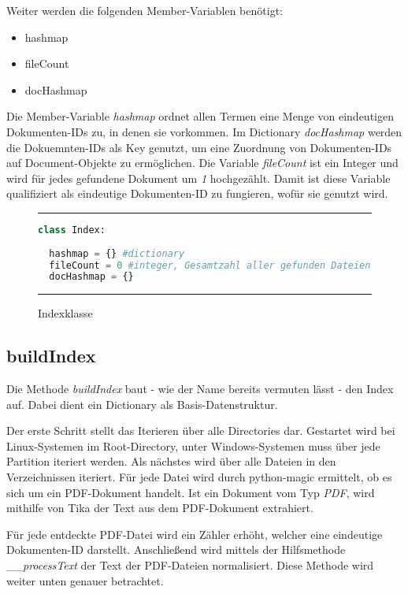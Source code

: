 Weiter werden die folgenden Member-Variablen benötigt:

\begin{itemize}
	\item hashmap
	\item fileCount
	\item docHashmap
\end{itemize}

Die Member-Variable \emph{hashmap} ordnet allen Termen eine Menge von eindeutigen Dokumenten-IDs zu, in denen sie vorkommen. Im Dictionary \emph{docHashmap} werden die Dokuemnten-IDs als Key genutzt, um eine Zuordnung von Dokumenten-IDs auf Document-Objekte zu ermöglichen. Die Variable \emph{fileCount} ist ein Integer und wird für jedes gefundene Dokument um \emph{1} hochgezählt. Damit ist diese Variable qualifiziert als eindeutige Dokumenten-ID zu fungieren, wofür sie genutzt wird.

\begin{figure}[h]
	\rule{\textwidth}{0.4pt}
		\begin{lstlisting}[language=Python]
class Index:
    
  hashmap = {} #dictionary
  fileCount = 0 #integer, Gesamtzahl aller gefunden Dateien
  docHashmap = {}
		\end{lstlisting}
	\rule{\textwidth}{0.4pt}
	\caption{Indexklasse}
	\label{fig:index}
\end{figure}

\subsection{buildIndex}\label{buildindex}

Die Methode \emph{buildIndex} baut - wie der Name bereits vermuten lässt - den Index auf. Dabei dient ein Dictionary als Basis-Datenstruktur.

Der erste Schritt stellt das Iterieren über alle Directories dar. Gestartet wird bei Linux-Systemen im Root-Directory, unter Windows-Systemen muss über jede Partition iteriert werden. Als nächstes wird über alle Dateien in den Verzeichnissen iteriert. Für jede Datei wird durch python-magic ermittelt, ob es sich um ein PDF-Dokument handelt. Ist ein Dokument vom Typ \emph{PDF}, wird mithilfe von Tika der Text aus dem PDF-Dokument extrahiert.

Für jede entdeckte PDF-Datei wird ein Zähler erhöht, welcher eine eindeutige Dokumenten-ID darstellt. Anschließend wird mittels der Hilfsmethode \_\_\emph{processText} der Text der PDF-Dateien normalisiert. Diese Methode wird weiter unten genauer betrachtet. 

